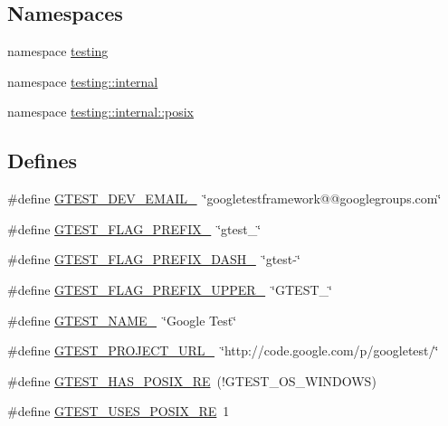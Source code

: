 \subsection*{\-Namespaces}
\begin{DoxyCompactItemize}
\item 
namespace \hyperlink{namespacetesting}{testing}
\item 
namespace \hyperlink{namespacetesting_1_1internal}{testing\-::internal}
\item 
namespace \hyperlink{namespacetesting_1_1internal_1_1posix}{testing\-::internal\-::posix}
\end{DoxyCompactItemize}
\subsection*{\-Defines}
\begin{DoxyCompactItemize}
\item 
\#define \hyperlink{gtest-port_8h_a21086d276b1a64d6763ee8a94b12c1b8}{\-G\-T\-E\-S\-T\-\_\-\-D\-E\-V\-\_\-\-E\-M\-A\-I\-L\-\_\-}~\char`\"{}googletestframework@@googlegroups.\-com\char`\"{}
\item 
\#define \hyperlink{gtest-port_8h_a088e84784c589ba9b1fc48602ad8eabf}{\-G\-T\-E\-S\-T\-\_\-\-F\-L\-A\-G\-\_\-\-P\-R\-E\-F\-I\-X\-\_\-}~\char`\"{}gtest\-\_\-\char`\"{}
\item 
\#define \hyperlink{gtest-port_8h_a4251ff898f9f94ec6b8b9402c3436759}{\-G\-T\-E\-S\-T\-\_\-\-F\-L\-A\-G\-\_\-\-P\-R\-E\-F\-I\-X\-\_\-\-D\-A\-S\-H\-\_\-}~\char`\"{}gtest-\/\char`\"{}
\item 
\#define \hyperlink{gtest-port_8h_a4018b7f288f974d022df397e2730633a}{\-G\-T\-E\-S\-T\-\_\-\-F\-L\-A\-G\-\_\-\-P\-R\-E\-F\-I\-X\-\_\-\-U\-P\-P\-E\-R\-\_\-}~\char`\"{}\-G\-T\-E\-S\-T\-\_\-\char`\"{}
\item 
\#define \hyperlink{gtest-port_8h_a13d98c217176bd8722c395b9225fc19d}{\-G\-T\-E\-S\-T\-\_\-\-N\-A\-M\-E\-\_\-}~\char`\"{}\-Google \-Test\char`\"{}
\item 
\#define \hyperlink{gtest-port_8h_a5aa3c938fc1d049f1d9c5332f6a0b1d4}{\-G\-T\-E\-S\-T\-\_\-\-P\-R\-O\-J\-E\-C\-T\-\_\-\-U\-R\-L\-\_\-}~\char`\"{}http\-://code.\-google.\-com/p/googletest/\char`\"{}
\item 
\#define \hyperlink{gtest-port_8h_af5c4295ea1d76f07f65934f659792431}{\-G\-T\-E\-S\-T\-\_\-\-H\-A\-S\-\_\-\-P\-O\-S\-I\-X\-\_\-\-R\-E}~(!\-G\-T\-E\-S\-T\-\_\-\-O\-S\-\_\-\-W\-I\-N\-D\-O\-W\-S)
\item 
\#define \hyperlink{gtest-port_8h_acecef794eeb09598cd47da764271cb18}{\-G\-T\-E\-S\-T\-\_\-\-U\-S\-E\-S\-\_\-\-P\-O\-S\-I\-X\-\_\-\-R\-E}~1

\end{DoxyCompactItemize}
